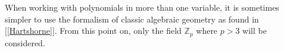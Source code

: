 When working with polynomials in more than one variable, it is sometimes simpler to use the formalism of classic algebraic geometry as found in [\ref{Hartshorne}]. From this point on, only the field $\mathbb{Z}_p$ where $p > 3$ will be considered. 
